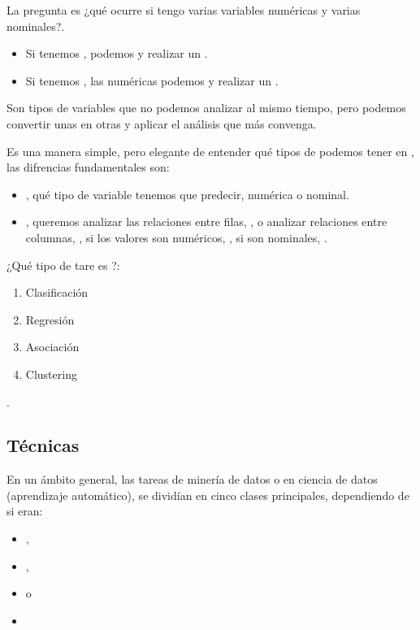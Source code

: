 La pregunta es ¿qué ocurre si tengo varias variables numéricas y varias nominales?.
\begin{itemize}
    \item Si tenemos , podemos  y realizar un .
    \item Si tenemos , las numéricas podemos  y realizar un .
\end{itemize}

Son tipos de variables que no podemos analizar al mismo tiempo, pero podemos convertir unas en otras y aplicar el análisis que más convenga.

Es una manera simple, pero elegante de entender qué tipos de  podemos tener en , las difrencias fundamentales son:
\begin{itemize}
    \item {}, qué tipo de variable tenemos que predecir, numérica o nominal.
    \item {}, queremos analizar las relaciones entre filas, , o analizar relaciones entre columnas, , si los valores son numéricos, , si son nominales, .
\end{itemize} 

¿Qué tipo de tare es ?:

\begin{enumerate}[label=\Alph*)]
    \item Clasificación
    \item Regresión 
    \item Asociación
    \item Clustering
\end{enumerate}

.

\subsection{Técnicas}

En un ámbito general, las tareas de minería de datos o en ciencia de datos (aprendizaje automático), se dividían en cinco clases principales, dependiendo de si eran:
\begin{itemize}
    \item {}, 
    \item {}, 
    \item {} o 
    \item {}
\end{itemize} 

